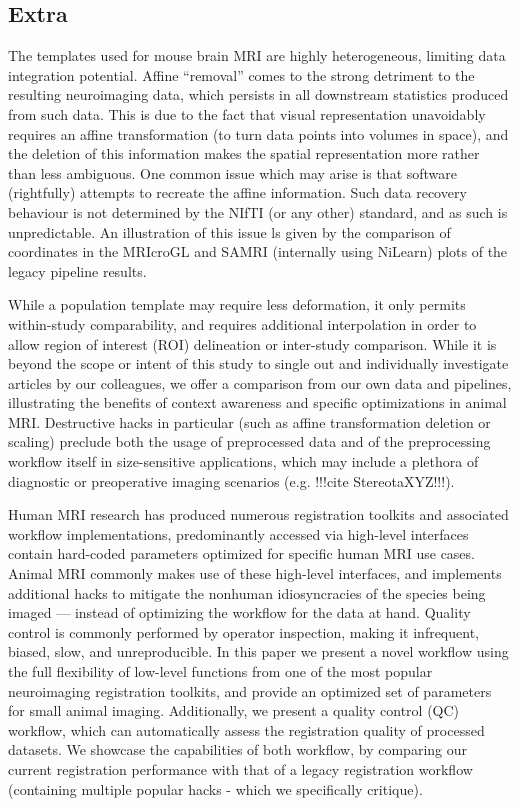 \subsection{Extra}
The templates used for mouse brain MRI are highly heterogeneous, limiting data integration potential.
Affine “removal” comes to the strong detriment to the resulting neuroimaging data, which persists in all downstream statistics produced from such data.
This is due to the fact that visual representation unavoidably requires an affine transformation (to turn data points into volumes in space), and the deletion of this information makes the spatial representation more rather than less ambiguous.
One common issue which may arise is that software (rightfully) attempts to recreate the affine information.
Such data recovery behaviour is not determined by the NIfTI (or any other) standard, and as such is unpredictable.
An illustration of this issue ls given by the comparison of coordinates in the MRIcroGL and SAMRI (internally using NiLearn) plots of the legacy pipeline results.

While a population template may require less deformation, it only permits within-study comparability, and requires additional interpolation in order to allow region of interest (ROI) delineation or inter-study comparison.
While it is beyond the scope or intent of this study to single out and individually investigate articles by our colleagues, we offer a comparison from our own data and pipelines, illustrating the benefits of context awareness and specific optimizations in animal MRI.
Destructive hacks in particular (such as affine transformation deletion or scaling) preclude both the usage of preprocessed data and of the preprocessing workflow itself in size-sensitive applications, which may include a plethora of diagnostic or preoperative imaging scenarios (e.g. !!!cite StereotaXYZ!!!).

Human MRI research has produced numerous registration toolkits and associated workflow implementations, predominantly accessed via high-level interfaces contain hard-coded parameters optimized for specific human MRI use cases.
Animal MRI commonly makes use of these high-level interfaces, and implements additional hacks to mitigate the nonhuman idiosyncracies of the species being imaged --- instead of optimizing the workflow for the data at hand.
Quality control is commonly performed by operator inspection, making it infrequent, biased, slow, and unreproducible.
In this paper we present a novel workflow using the full flexibility of low-level functions from one of the most popular neuroimaging registration toolkits, and provide an optimized set of parameters for small animal imaging.
Additionally, we present a quality control (QC) workflow, which can automatically assess the registration quality of processed datasets.
We showcase the capabilities of both workflow, by comparing our current registration performance with that of a legacy registration workflow (containing multiple popular hacks - which we specifically critique).


